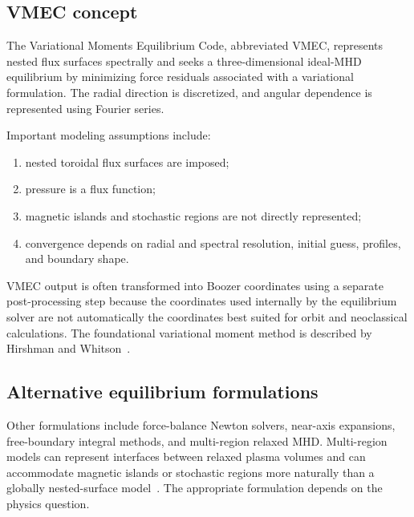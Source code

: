 \subsection{VMEC concept}
The Variational Moments Equilibrium Code, abbreviated VMEC, represents nested flux surfaces spectrally and seeks a three-dimensional ideal-MHD equilibrium by minimizing force residuals associated with a variational formulation. The radial direction is discretized, and angular dependence is represented using Fourier series.

Important modeling assumptions include:
\begin{enumerate}[leftmargin=1.6em]
\item nested toroidal flux surfaces are imposed;
\item pressure is a flux function;
\item magnetic islands and stochastic regions are not directly represented;
\item convergence depends on radial and spectral resolution, initial guess, profiles, and boundary shape.
\end{enumerate}
VMEC output is often transformed into Boozer coordinates using a separate post-processing step because the coordinates used internally by the equilibrium solver are not automatically the coordinates best suited for orbit and neoclassical calculations. The foundational variational moment method is described by Hirshman and Whitson~\cite{hirshmanWhitson1983}.

\subsection{Alternative equilibrium formulations}
Other formulations include force-balance Newton solvers, near-axis expansions, free-boundary integral methods, and multi-region relaxed MHD. Multi-region models can represent interfaces between relaxed plasma volumes and can accommodate magnetic islands or stochastic regions more naturally than a globally nested-surface model~\cite{hudson2012}. The appropriate formulation depends on the physics question.

